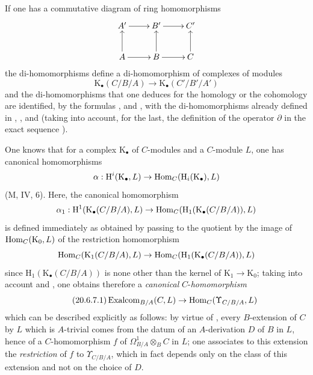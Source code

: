 If one has a commutative diagram of ring homomorphisms
\[
\xymatrix{
  A' \ar[r] & B' \ar[r] & C' \\
  A \ar[u] \ar[r] & B \ar[u] \ar[r] & C \ar[u]
}
\]
the di-homomorphisms  define a di-homomorphism of complexes of modules
\begin{equation}
\tag{20.6.6.4}
  \label{0.20.6.6.4}
  \mathrm{K}_\bullet(C/B/A)\to\mathrm{K}_\bullet(C'/B'/A')
\end{equation}
and the di-homomorphisms that one deduces for the homology or the cohomology are identified, by the formulas ,  and , with the di-homomorphisms already defined in , ,  and  (taking into account, for the last, the definition of the operator $\partial$ in the exact sequence ).

\begin{env}[20.6.7]
\label{0.20.6.7}
One knows that for a complex $\mathrm{K}_\bullet$ of $C$-modules and a $C$-module $L$, one has canonical homomorphisms
\[
  \alpha:\mathrm{H}^i(\mathrm{K}_\bullet,L)\to\operatorname{Hom}_C(\mathrm{H}_i(\mathrm{K}_\bullet),L)
\]
(M, IV, 6).
Here, the canonical homomorphism
\[
  \alpha_1:\mathrm{H}^1(\mathrm{K}_\bullet(C/B/A),L)\to\operatorname{Hom}_C(\mathrm{H}_1(\mathrm{K}_\bullet(C/B/A)),L)
\]
is defined immediately as obtained by passing to the quotient by the image of $\operatorname{Hom}_C(\mathrm{K}_0,L)$ of the restriction homomorphism
\[
  \operatorname{Hom}_C(\mathrm{K}_1(C/B/A),L)\to\operatorname{Hom}_C(\mathrm{H}_1(\mathrm{K}_\bullet(C/B/A)),L)
\]
since $\mathrm{H}_1(\mathrm{K}_\bullet(C/B/A))$ is none other than the kernel of $\mathrm{K}_1\to\mathrm{K}_0$; taking into account  and , one obtains therefore a \emph{canonical} $C$-\emph{homomorphism}
\begin{equation}
\tag{20.6.7.1}
  \label{0.20.6.7.1}
  \operatorname{Exalcom}_{B/A}(C,L)\to\operatorname{Hom}_C(\Upsilon_{C/B/A},L)
\end{equation}
which can be described explicitly as follows: by virtue of , every $B$-extension of $C$ by $L$ which is $A$-trivial comes from the datum of an $A$-derivation $D$ of $B$ in $L$, hence  of a $C$-homomorphism $f$ of $\Omega^1_{B/A}\otimes_B C$ in $L$; one associates to this extension the \emph{restriction} of $f$ to $\Upsilon_{C/B/A}$, which in fact depends only on the class of this extension and not on the choice of $D$.
\end{env}

